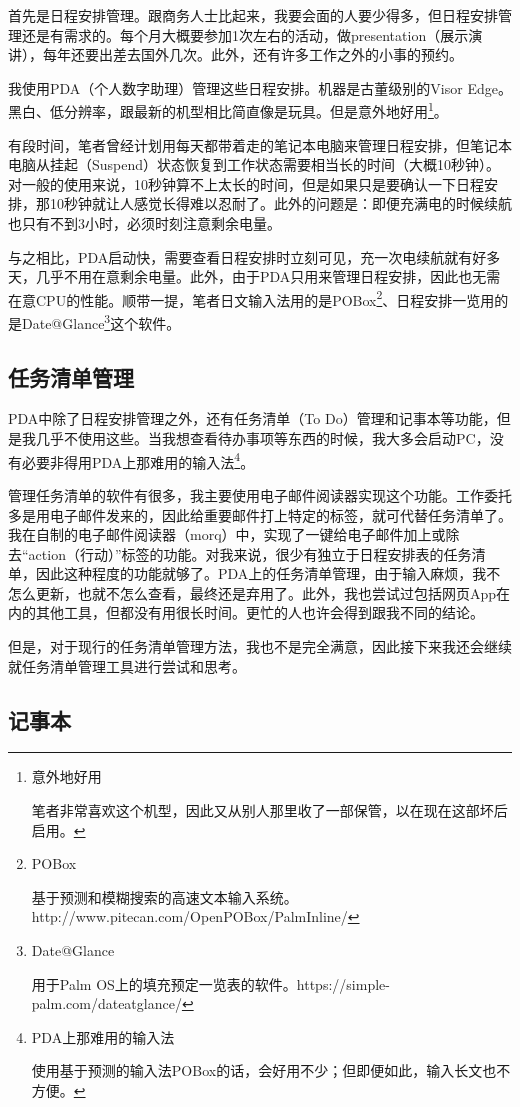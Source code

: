 \documentclass[a4paper,12pt]{article}
\begin{document}
首先是日程安排管理。跟商务人士比起来，我要会面的人要少得多，但日程安排管理还是有需求的。每个月大概要参加1次左右的活动，做presentation（展示演讲），每年还要出差去国外几次。此外，还有许多工作之外的小事的预约。

我使用PDA（个人数字助理）管理这些日程安排。机器是古董级别的Visor Edge。黑白、低分辨率，跟最新的机型相比简直像是玩具。但是意外地好用\footnote{意外地好用

笔者非常喜欢这个机型，因此又从别人那里收了一部保管，以在现在这部坏后启用。}。

有段时间，笔者曾经计划用每天都带着走的笔记本电脑来管理日程安排，但笔记本电脑从挂起（Suspend）状态恢复到工作状态需要相当长的时间（大概10秒钟）。对一般的使用来说，10秒钟算不上太长的时间，但是如果只是要确认一下日程安排，那10秒钟就让人感觉长得难以忍耐了。此外的问题是：即便充满电的时候续航也只有不到3小时，必须时刻注意剩余电量。

与之相比，PDA启动快，需要查看日程安排时立刻可见，充一次电续航就有好多天，几乎不用在意剩余电量。此外，由于PDA只用来管理日程安排，因此也无需在意CPU的性能。顺带一提，笔者日文输入法用的是POBox\footnote{POBox

基于预测和模糊搜索的高速文本输入系统。http://www.pitecan.com/OpenPOBox/PalmInline/}、日程安排一览用的是Date@Glance\footnote{Date@Glance

用于Palm OS上的填充预定一览表的软件。https://simple-palm.com/dateatglance/}这个软件。

\subsection{任务清单管理}

PDA中除了日程安排管理之外，还有任务清单（To Do）管理和记事本等功能，但是我几乎不使用这些。当我想查看待办事项等东西的时候，我大多会启动PC，没有必要非得用PDA上那难用的输入法\footnote{PDA上那难用的输入法

使用基于预测的输入法POBox的话，会好用不少；但即便如此，输入长文也不方便。}。

管理任务清单的软件有很多，我主要使用电子邮件阅读器实现这个功能。工作委托多是用电子邮件发来的，因此给重要邮件打上特定的标签，就可代替任务清单了。我在自制的电子邮件阅读器（morq）中，实现了一键给电子邮件加上或除去“action（行动）”标签的功能。对我来说，很少有独立于日程安排表的任务清单，因此这种程度的功能就够了。PDA上的任务清单管理，由于输入麻烦，我不怎么更新，也就不怎么查看，最终还是弃用了。此外，我也尝试过包括网页App在内的其他工具，但都没有用很长时间。更忙的人也许会得到跟我不同的结论。

但是，对于现行的任务清单管理方法，我也不是完全满意，因此接下来我还会继续就任务清单管理工具进行尝试和思考。

\subsection{记事本}
\end{document}
